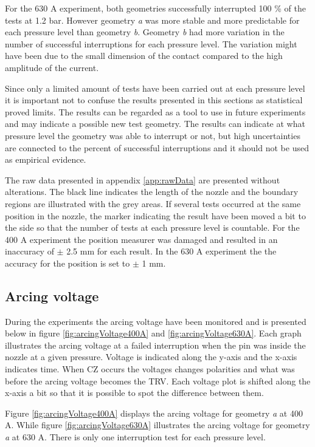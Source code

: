 \documentclass[10pt,a4paper,twoside]{article}
\begin{document}
For the 630 A experiment, both geometries successfully interrupted 100 \% of the tests at 1.2 bar. However geometry \textit{a} was more stable and more predictable for each pressure level than geometry \textit{b}. Geometry \textit{b} had more variation in the number of successful interruptions for each pressure level. The variation might have been due to the small dimension of the contact compared to the high amplitude of the current.

Since only a limited amount of tests have been carried out at each pressure level it is important not to confuse the results presented in this sections as statistical proved limits. The results can be regarded as a tool to use in future experiments and may indicate a possible new test geometry. The results can indicate at what pressure level the geometry was able to interrupt or not, but high uncertainties are connected to the percent of successful interruptions and it should not be used as empirical evidence.

The raw data presented in appendix \ref{app:rawData} are presented without alterations. The black line indicates the length of the nozzle and the boundary regions are illustrated with the grey areas. If several tests occurred at the same position in the nozzle, the marker indicating the result have been moved a bit to the side so that the number of tests at each pressure level is countable. For the 400 A experiment the position measurer was damaged and resulted in an inaccuracy of $\pm$ 2.5 mm for each result. In the 630 A experiment the the accuracy for the position is set to $\pm$ 1 mm.

\subsection{Arcing voltage}
During the experiments the arcing voltage have been monitored and is presented below in figure \ref{fig:arcingVoltage400A} and \ref{fig:arcingVoltage630A}. Each graph illustrates the arcing voltage at a failed interruption when the pin was inside the nozzle at a given pressure. Voltage is indicated along the y-axis and the x-axis indicates time. When CZ occurs the voltages changes polarities and what was before the arcing voltage becomes the TRV. Each voltage plot is shifted along the x-axis a bit so that it is possible to spot the difference between them.

Figure \ref{fig:arcingVoltage400A} displays the arcing voltage for geometry \textit{a} at 400 A. While figure \ref{fig:arcingVoltage630A} illustrates the arcing voltage for geometry \textit{a} at 630 A. There is only one interruption test for each pressure level.
\end{document}
